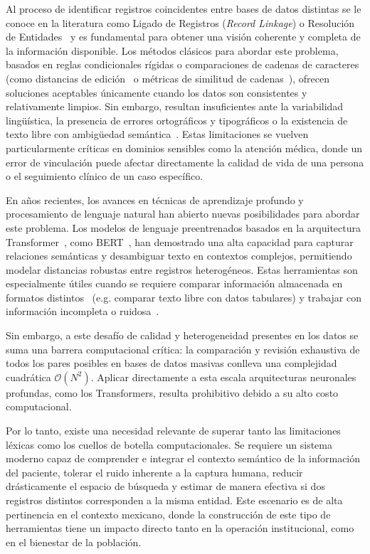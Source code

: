 Al proceso de identificar registros coincidentes entre bases de datos distintas se le conoce en la literatura como Ligado de Registros (\textit{Record Linkage}) o Resolución de Entidades~\cite{dunn1946,fellegi1969,li2020} y es fundamental para obtener una visión coherente y completa de la información disponible. Los métodos clásicos para abordar este problema, basados en reglas condicionales rígidas o comparaciones de cadenas de caracteres (como distancias de edición~\cite{levenshtein1966,damerau1964} o métricas de similitud de cadenas~\cite{jaro1989}), ofrecen soluciones aceptables únicamente cuando los datos son consistentes y relativamente limpios. Sin embargo, resultan insuficientes ante la variabilidad lingüística, la presencia de errores ortográficos y tipográficos o la existencia de texto libre con ambigüedad semántica~\cite{li2020}.
Estas limitaciones se vuelven particularmente críticas en dominios sensibles como la atención médica, donde un error de vinculación puede afectar directamente la calidad de vida de una persona o el seguimiento clínico de un caso específico.

En años recientes, los avances en técnicas de aprendizaje profundo y procesamiento de lenguaje natural han abierto nuevas posibilidades para abordar este problema. Los modelos de lenguaje preentrenados basados en la arquitectura Transformer~\cite{vaswani2017}, como BERT~\cite{devlin2019}, han demostrado una alta capacidad para capturar relaciones semánticas y desambiguar texto en contextos complejos, permitiendo modelar distancias robustas entre registros heterogéneos. Estas herramientas son especialmente útiles cuando se requiere comparar información almacenada en formatos distintos~\cite{li2020,cappuzzo2020} (e.g. comparar texto libre con datos tabulares) y trabajar con información incompleta o ruidosa~\cite{ong2014,li2020}.

Sin embargo, a este desafío de calidad y heterogeneidad presentes en los datos se suma una barrera computacional crítica: la comparación y revisión exhaustiva de todos los pares posibles en bases de datos masivas conlleva una complejidad cuadrática $\mathcal{O}(N^2)$. Aplicar directamente a esta escala arquitecturas neuronales profundas, como los Transformers, resulta prohibitivo debido a su alto costo computacional.

Por lo tanto, existe una necesidad relevante de superar tanto las limitaciones léxicas como los cuellos de botella computacionales. Se requiere un sistema moderno capaz de comprender e integrar el contexto semántico de la información del paciente, tolerar el ruido inherente a la captura humana, reducir drásticamente el espacio de búsqueda y estimar de manera efectiva si dos registros distintos corresponden a la misma entidad. Este escenario es de alta pertinencia en el contexto mexicano, donde la construcción de este tipo de herramientas tiene un impacto directo tanto en la operación institucional, como en el bienestar de la población.


